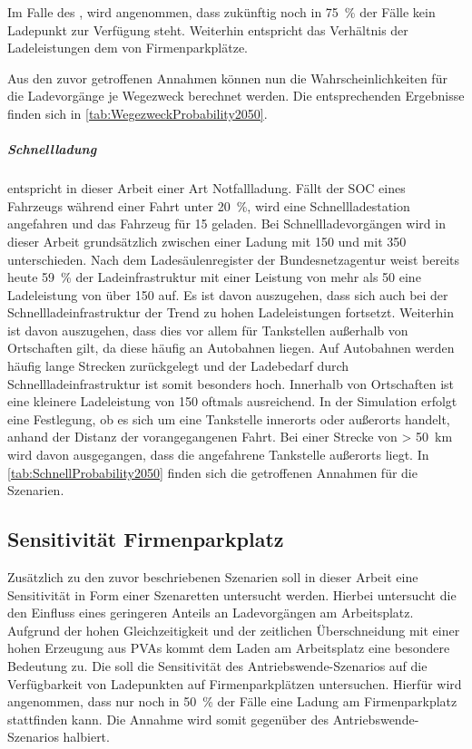 Im Falle des \UCs \Straszenranddot, wird angenommen, dass zukünftig noch in \SI{75}{\percent} der Fälle kein Ladepunkt zur Verfügung steht.
Weiterhin entspricht das Verhältnis der Ladeleistungen dem von Firmenparkplätze.\medskip

Aus den zuvor getroffenen Annahmen können nun die Wahrscheinlichkeiten für die Ladevorgänge je Wegezweck berechnet werden.
Die entsprechenden Ergebnisse finden sich in \autoref{tab:WegezweckProbability2050}.




\subparagraph{Schnellladung} entspricht in dieser Arbeit einer Art Notfallladung.
Fällt der \gls{SOC} eines Fahrzeugs während einer Fahrt unter \SI{20}{\percent}, wird eine Schnellladestation angefahren und das Fahrzeug für \SI{15}{\Minuten} geladen.
Bei Schnellladevorgängen wird in dieser Arbeit grundsätzlich zwischen einer Ladung mit \SI{150}{\kw} und mit \SI{350}{\kw} unterschieden.
Nach dem Ladesäulenregister der Bundesnetzagentur \cite[][Stand: ]{BundesnetzagenturElektrizitaet2020} weist bereits heute \SI{59}{\percent} der Ladeinfrastruktur mit einer Leistung von mehr als \SI{50}{\kw} eine Ladeleistung von über \SI{150}{\kw} auf.
Es ist davon auszugehen, dass sich auch bei der Schnellladeinfrastruktur der Trend zu hohen Ladeleistungen fortsetzt.
Weiterhin ist davon auszugehen, dass dies vor allem für Tankstellen außerhalb von Ortschaften gilt, da diese häufig an Autobahnen liegen.
Auf Autobahnen werden häufig lange Strecken zurückgelegt und der Ladebedarf durch Schnellladeinfrastruktur ist somit besonders hoch.
Innerhalb von Ortschaften ist eine kleinere Ladeleistung von \SI{150}{\kw} oftmals ausreichend.
In der Simulation erfolgt eine Festlegung, ob es sich um eine Tankstelle innerorts oder außerorts handelt, anhand der Distanz der vorangegangenen Fahrt.
Bei einer Strecke von \SI{> 50}{\km} wird davon ausgegangen, dass die angefahrene Tankstelle außerorts liegt.
In \autoref{tab:SchnellProbability2050} finden sich die getroffenen Annahmen für die Szenarien.




\subsection{Sensitivität \glqq Firmenparkplatz\grqq}

Zusätzlich zu den zuvor beschriebenen Szenarien soll in dieser Arbeit eine Sensitivität in Form einer Szenaretten untersucht werden.
Hierbei untersucht die \SzeFirmenparkplatz den Einfluss eines geringeren Anteils an Ladevorgängen am Arbeitsplatz.
Aufgrund der hohen Gleichzeitigkeit und der zeitlichen Überschneidung mit einer hohen Erzeugung aus \glspl{PVA} kommt dem Laden am Arbeitsplatz eine besondere Bedeutung zu.
Die \SzeFirmenparkplatz soll die Sensitivität des Antriebswende-Szenarios auf die Verfügbarkeit von Ladepunkten auf Firmenparkplätzen untersuchen.
Hierfür wird angenommen, dass nur noch in \SI{50}{\percent} der Fälle eine Ladung am Firmenparkplatz stattfinden kann.
Die Annahme wird somit gegenüber des Antriebswende-Szenarios halbiert.

